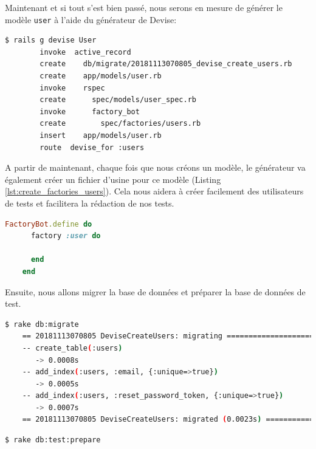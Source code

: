 \documentclass[]{report}
\begin{document}
    Maintenant et si tout s'est bien passé, nous serons en mesure de générer le modèle \verb|user| à l'aide du générateur de Devise:

    \begin{scriptsize}
    \begin{lstlisting}[language=bash]
    $ rails g devise User
        invoke  active_record
        create    db/migrate/20181113070805_devise_create_users.rb
        create    app/models/user.rb
        invoke    rspec
        create      spec/models/user_spec.rb
        invoke      factory_bot
        create        spec/factories/users.rb
        insert    app/models/user.rb
        route  devise_for :users
    \end{lstlisting}
    \end{scriptsize}

    A partir de maintenant, chaque fois que nous créons un modèle, le générateur va également créer un fichier d'usine pour ce modèle (Listing \ref{lst:create_factories_users}). Cela nous aidera à créer facilement des utilisateurs de tests et facilitera la rédaction de nos tests.

    \begin{scriptsize}
    \begin{lstlisting}[language=ruby, caption={Usine d'utilsateurs (spec/factories/users.rb)}, label={lst:create_factories_users}]
    FactoryBot.define do
      factory :user do

      end
    end
    \end{lstlisting}
    \end{scriptsize}

    Ensuite, nous allons migrer la base de données et préparer la base de données de test.

    \begin{scriptsize}
    \begin{lstlisting}[language=bash]
    $ rake db:migrate
    == 20181113070805 DeviseCreateUsers: migrating ================================
    -- create_table(:users)
       -> 0.0008s
    -- add_index(:users, :email, {:unique=>true})
       -> 0.0005s
    -- add_index(:users, :reset_password_token, {:unique=>true})
       -> 0.0007s
    == 20181113070805 DeviseCreateUsers: migrated (0.0023s) =======================
    \end{lstlisting}
    \end{scriptsize}

    \begin{scriptsize}
    \begin{lstlisting}[language=bash]
    $ rake db:test:prepare
    \end{lstlisting}
    \end{scriptsize}
\end{document}
